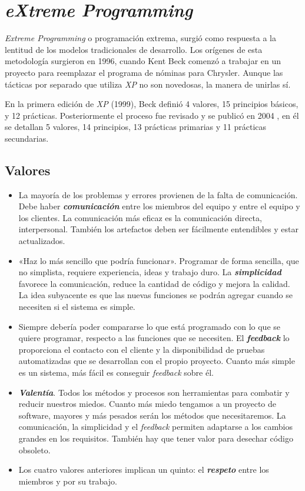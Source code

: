 \section{\textit{eXtreme Programming}}
\textit{Extreme Programming}  o programación extrema, surgió como respuesta a la lentitud de los modelos tradicionales de desarrollo. Los orígenes de esta metodología surgieron en 1996, cuando Kent Beck comenzó a trabajar en un proyecto para reemplazar el programa de nóminas para Chrysler. Aunque las tácticas por separado que utiliza \textit{XP} no son novedosas, la manera de unirlas sí. 

En la primera edición de \textit{XP} (1999), Beck definió 4 valores, 15 principios básicos, y 12 prácticas. Posteriormente el proceso fue revisado y se publicó en 2004 \cite{Beck:2004:EPE:1076267}, en él se detallan 5 valores, 14 principios, 13 prácticas primarias y 11 prácticas secundarias.

\subsection{Valores}
\begin{itemize}
\item La mayoría de los problemas y errores provienen de la falta de comunicación. Debe haber \textbf{\textit{comunicación}} entre los miembros del equipo y entre el equipo y los clientes. La comunicación más eficaz es la comunicación directa, interpersonal. También los artefactos deben ser fácilmente entendibles y estar actualizados.

\item «Haz lo más sencillo que podría funcionar». Programar de forma sencilla, que no simplista, requiere experiencia, ideas y trabajo duro. La \textbf{\textit{simplicidad}} favorece la comunicación, reduce la cantidad de código y mejora la calidad. La idea subyacente es que las nuevas funciones se podrán agregar cuando se necesiten si el sistema es simple.

\item Siempre debería poder compararse lo que está programado con lo que se quiere programar, respecto a las funciones que se necesiten. El \textbf{\textit{feedback}} lo proporciona el contacto con el cliente y la disponibilidad de pruebas automatizadas que se desarrollan con el propio proyecto. Cuanto más simple es un sistema, más fácil es conseguir \textit{feedback} sobre él. 

\item \textbf{\textit{Valentía}}. Todos los métodos y procesos son herramientas para combatir y reducir nuestros miedos. Cuanto más miedo tengamos a un proyecto de software, mayores y más pesados serán los métodos que necesitaremos. La comunicación, la simplicidad y el \textit{feedback} permiten adaptarse a los cambios grandes en los requisitos. También hay que tener valor para desechar código obsoleto.

\item Los cuatro valores anteriores implican un quinto: el \textbf{\textit{respeto}} entre los miembros y por su trabajo.
\end{itemize}

